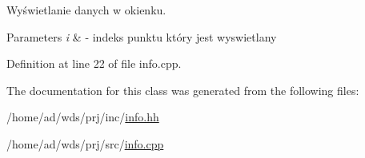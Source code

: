 Wyświetlanie danych w okienku. 


\begin{DoxyParams}{Parameters}
{\em i} & -\/ indeks punktu który jest wyswietlany \\
\hline
\end{DoxyParams}


Definition at line 22 of file info.\+cpp.



The documentation for this class was generated from the following files\+:\begin{DoxyCompactItemize}
\item 
/home/ad/wds/prj/inc/\hyperlink{info_8hh}{info.\+hh}\item 
/home/ad/wds/prj/src/\hyperlink{info_8cpp}{info.\+cpp}\end{DoxyCompactItemize}
